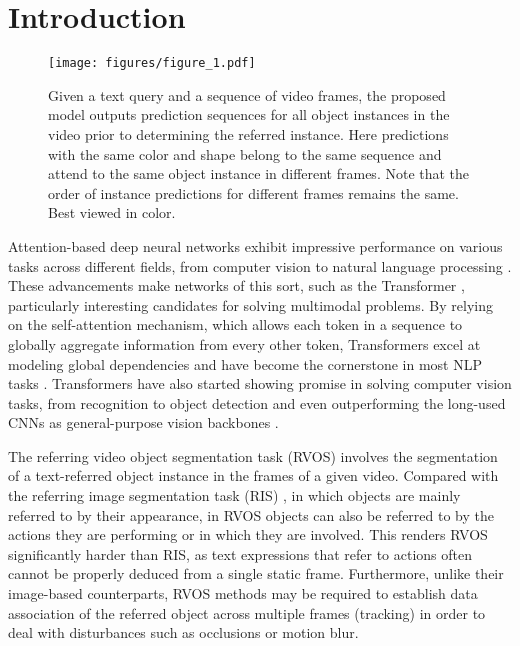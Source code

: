 \documentclass[10pt,twocolumn,letterpaper]{article}
\renewcommand{\cite}[1]{\citep{#1}}
\begin{document}
\section{Introduction}
\label{sec:intro}

\begin{figure}
\centering
\texttt{[image: figures/figure\_1.pdf]}
 \caption{Given a text query and a sequence of video frames, the proposed model outputs prediction sequences for all object instances in the video prior to determining the referred instance. Here predictions with the same color and shape belong to the same sequence and attend to the same object instance in different frames. Note that the order of instance predictions for different frames remains the same. Best viewed in color.
 }
\vspace{-0.1cm}
\label{fig:task_visual}
\vspace{-0.55cm}
\end{figure}

Attention-based \cite{vaswani2017attention} deep neural networks exhibit impressive performance on various tasks across different fields, from computer vision \cite{ViT_2021,liu2021swin} to natural language processing \cite{Devlin2019BERTPO,brown2020gpt3}. These advancements make networks of this sort, such as the Transformer \cite{vaswani2017attention}, particularly interesting candidates for solving multimodal problems. By relying on the self-attention mechanism, which allows each token in a sequence to globally aggregate information from every other token, Transformers excel at modeling global dependencies and have become the cornerstone in most NLP tasks \cite{Devlin2019BERTPO, yang2019xlnet, radford2019language,brown2020gpt3}. Transformers have also started showing promise in solving computer vision tasks, from recognition \cite{ViT_2021} to object detection \cite{carion2020detr} and even outperforming the long-used CNNs as general-purpose vision backbones \cite{liu2021swin}.


The referring video object segmentation task (RVOS) involves the segmentation of a text-referred object instance in the frames of a given video. Compared with the referring image segmentation task (RIS) \cite{yu2016refcoco,mao2016refcocoplus}, in which objects are mainly referred to by their appearance, in RVOS objects can also be referred to by the actions they are performing or in which they are involved. This renders RVOS significantly harder than RIS, as text expressions that refer to actions often cannot be properly deduced from a single static frame. Furthermore, unlike their image-based counterparts, RVOS methods may be required to establish data association of the referred object across multiple frames (tracking) in order to deal with disturbances such as occlusions or motion blur. 
\end{document}
